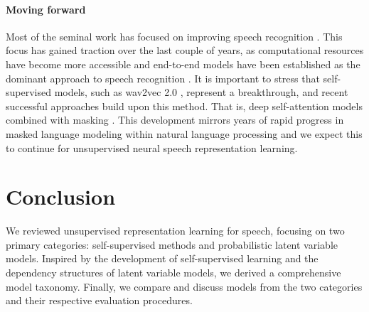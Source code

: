 \paragraph{Moving forward} 

Most of the seminal work has focused on improving speech recognition \cite{schneider2019wav2vec, baevski2020wav2vec}. This focus has gained traction over the last couple of years, as computational resources have become more accessible and end-to-end models \cite{graves2006connectionist, chan2016listen} have been established as the dominant approach to speech recognition \cite{gulati2020conformer}. It is important to stress that self-supervised models, such as wav2vec 2.0 \cite{baevski2020wav2vec}, represent a breakthrough, and recent successful approaches build upon this method. That is, deep self-attention models combined with masking \cite{hsu2021hubert, wang2021unispeech, chen2021wavlm}. This development mirrors years of rapid progress in masked language modeling within natural language processing \cite{devlin2019bert,clark_2020_electra} and we expect this to continue for unsupervised neural speech representation learning.


\section{Conclusion}
\label{sec:conc}

We reviewed unsupervised representation learning for speech, focusing on two primary categories: self-supervised methods and probabilistic latent variable models. Inspired by the development of self-supervised learning and the dependency structures of latent variable models, we derived a comprehensive model taxonomy. Finally, we compare and discuss models from the two categories and their respective evaluation procedures.


